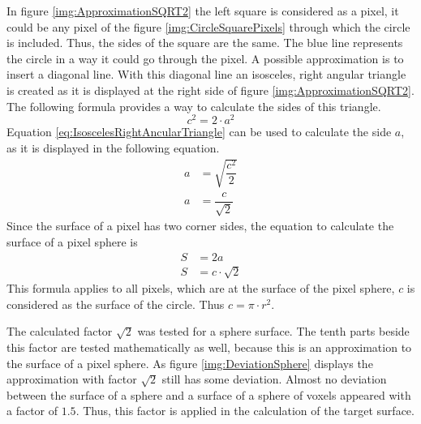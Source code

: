 In figure \ref{img:ApproximationSQRT2} the left square is considered as a pixel, it could be any pixel of the figure \ref{img:CircleSquarePixels} through which the circle is included. Thus, the sides of the square are the same. The blue line represents the circle in a way it could go through the pixel. A possible approximation is to insert a diagonal line. With this diagonal line an isosceles, right angular triangle is created as it is displayed at the right side of figure \ref{img:ApproximationSQRT2}. \newline
The following formula provides a way to calculate the sides of this triangle.
\begin{equation}\label{eq:IsoscelesRightAncularTriangle}
c^{2} = 2 \cdot a^{2}
\end{equation}
Equation \ref{eq:IsoscelesRightAncularTriangle} can be used to calculate the side $a$, as it is displayed in the following equation.
\begin{equation}\label{eq:CornerSideAOfTriangle}
\begin{split}
a &= \sqrt{\dfrac{c^{2}}{2}} \\
a &= \dfrac{c}{\sqrt{2}}
\end{split}
\end{equation}
Since the surface of a pixel has two corner sides, the equation to calculate the surface of a pixel sphere is
\begin{equation}\label{eq:PixelSurfaceCalculation}
\begin{split}
S &= 2a \\
S &= c \cdot \sqrt{2}
\end{split}
\end{equation}
This formula applies to all pixels, which are at the surface of the pixel sphere, $c$ is considered as the surface of the circle. Thus $c = \pi \cdot r^{2}$.

The calculated factor $\sqrt{2}$ was tested for a sphere surface. The tenth parts beside this factor are tested mathematically as well, because this is an approximation to the surface of a pixel sphere. As figure \ref{img:DeviationSphere} displays the  approximation with factor $\sqrt{2}$ still has some deviation. Almost no deviation between the surface of a sphere and a surface of a sphere of voxels appeared with a factor of $1.5$. Thus, this factor is applied in the calculation of the target surface. 

